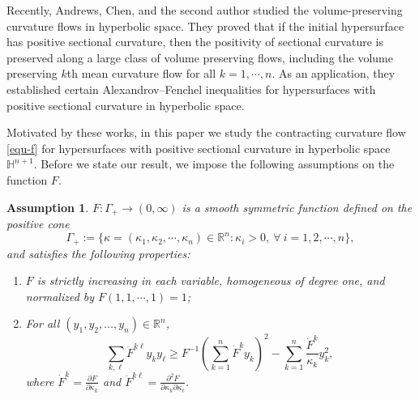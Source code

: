 \documentclass[11pt,reqno]{amsart}
\newtheorem{assumption}[proposition]{Assumption}
\theoremstyle{remark}
\numberwithin{equation}{section}
\begin{document}
Recently, Andrews, Chen, and the second author \cite{ACW21} studied the volume-preserving curvature flows in hyperbolic space. They proved that if the initial hypersurface has positive sectional curvature, then the positivity of sectional curvature is preserved along a large class of volume preserving flows, including the volume preserving $k$th mean curvature flow for all $k=1,\cdots,n$. As an application, they established certain Alexandrov–Fenchel inequalities for hypersurfaces with positive sectional curvature in hyperbolic space. 

Motivated by these works, in this paper we study the contracting curvature flow \eqref{equ-f} for hypersurfaces with positive sectional curvature in hyperbolic space $\mathbb{H}^{n+1}$. Before we state our result, we impose the following assumptions on the function $F$.

\begin{assumption}	\label{assumption}
$F:\Gamma_+\to (0,\infty)$ is a smooth symmetric function defined on the positive cone
	\begin{equation*}
		\Gamma_+ := \{ \kappa=(\kappa_1,\kappa_2,\cdots,\kappa_n)\in\mathbb{R}^n:\kappa_i>0,\ \forall\ i=1,2,\cdots,n \},
	\end{equation*}
	and satisfies the following properties:
	\begin{enumerate}
		\item[{\rm (i)}] $F$ is strictly increasing in each variable, homogeneous of degree one, and normalized by $F(1,1,\cdots,1)=1$;
		\item[{\rm (ii)}] For all $(y_1,y_2,\dots,y_n)\in\mathbb{R}^n$,
		\begin{equation}
			\sum\limits_{k,\ell}\ddot{F}^{k\ell}y_ky_{\ell} \geq F^{-1} \left(\sum\limits_{k=1}^n \dot{F}^k y_k \right)^2 - \sum\limits_{k=1}^n \dfrac{\dot{F}^k}{\kappa_k}y_k^2,
			\label{equ-property3}
		\end{equation}
        where $\dot{F}^k=\frac{\partial F}{\partial \kappa_k}$ and $\ddot{F}^{k\ell}=\frac{\partial^2F}{\partial\kappa_k\partial\kappa_\ell}$. 
	\end{enumerate}
\end{assumption}
\end{document}
